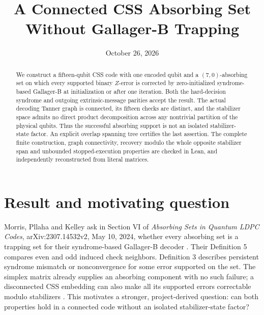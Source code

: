 \documentclass[11pt]{article}
\title{A Connected CSS Absorbing Set Without Gallager-B Trapping}
\author{}
\date{October 26, 2026}
\begin{document}
\maketitle
\begin{abstract}
We construct a fifteen-qubit CSS code with one encoded qubit and a
$(7,0)$-absorbing set on which every supported binary $Z$-error is corrected
by zero-initialized syndrome-based Gallager-B at initialization or after one
iteration. Both the hard-decision syndrome and outgoing extrinsic-message
parities accept the result. The actual decoding Tanner graph is connected,
its fifteen checks are distinct, and the stabilizer space admits no direct
product decomposition across any nontrivial partition of the physical qubits.
Thus the successful absorbing support is not an isolated stabilizer-state
factor. An explicit overlap spanning tree certifies the last assertion.
The complete finite construction, graph connectivity, recovery modulo the
whole opposite stabilizer span and unbounded stopped-execution properties
are checked in Lean, and independently reconstructed from literal matrices.
\end{abstract}

\section{Result and motivating question}
Morris, Pllaha and Kelley ask in Section VI of
\emph{Absorbing Sets in Quantum LDPC Codes}, arXiv:2307.14532v2,
May 10, 2024, whether every absorbing set is a trapping set for their
syndrome-based Gallager-B decoder \cite{mpk}. Their Definition 5 compares
even and odd induced check neighbors. Definition 3 describes persistent
syndrome mismatch or nonconvergence for some error supported on the set.
The simplex matrix already supplies an absorbing component with no such
failure; a disconnected CSS embedding can also make all its supported
errors correctable modulo stabilizers \cite{previous}. This motivates a
stronger, project-derived question: can both properties hold in a connected
code without an isolated stabilizer-state factor?
\end{document}
